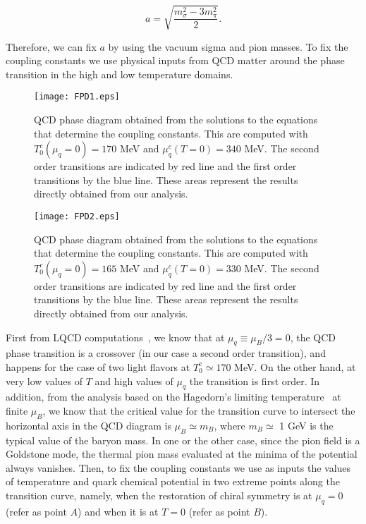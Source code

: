 \documentclass[%
 reprint,
showpacs,preprintnumbers,
 amsmath,amssymb,
onecolumn]{revtex4}
\begin{document}
\begin{equation}
    a=\sqrt{\frac{m_\sigma^2-3m_\pi^2}{2}}.
    \label{afixed}
\end{equation}

Therefore, we can fix $a$ by using the vacuum sigma and pion masses. To fix the coupling constants we use physical inputs from QCD matter around the phase transition in the high and low temperature domains.

\begin{figure}[t]
\begin{center}
\texttt{[image: FPD1.eps]}
\end{center}
\caption{QCD phase diagram obtained from the solutions to the equations that determine the coupling constants. This are computed with $T^c_0(\mu_q=0)=170$ MeV and $\mu^c_q(T=0)=340$ MeV. The second order transitions are indicated by red line and the first order transitions by the blue line. These areas represent the results directly obtained from our analysis.}
\label{FPD1}
\end{figure}
\begin{figure}[t]
\begin{center}
\texttt{[image: FPD2.eps]}
\end{center}
\caption{QCD phase diagram obtained from the solutions to the equations that determine the coupling constants. This are computed with $T^c_0(\mu_q=0)=165$ MeV and $\mu^c_q(T=0)=330$ MeV. The second order transitions are indicated by red line and the first order transitions by the blue line. These areas represent the results directly obtained from our analysis.}
\label{FPD2}
\end{figure}

First from LQCD computations~\cite{latticeTc}, we know that at $\mu_q\equiv\mu_B/3=0$, the QCD phase transition is a crossover (in our case a second order transition), and happens for the case of two light flavors at $T^c_0\simeq 170$ MeV. On the other hand, at very low values of $T$ and high values of $\mu_q$ the transition is first order. In addition, from the analysis based on the Hagedorn's limiting temperature~\cite{Hagedorn} at finite $\mu_B$, we know that the critical value for the transition curve to intersect the horizontal axis in the QCD diagram is $\mu_B\simeq m_B$, where $m_B\simeq$ 1 GeV is the typical value of the baryon mass. In one or the other case, since the pion field is a Goldstone mode, the thermal pion mass evaluated at the minima of the potential always vanishes. Then, to fix the coupling constants we use as inputs the values of temperature and quark chemical potential in two extreme points along the transition curve, namely, when the restoration of chiral symmetry is at $\mu_q=0$ (refer as point $A$) and when it is at $T=0$ (refer as point $B$).
\end{document}
